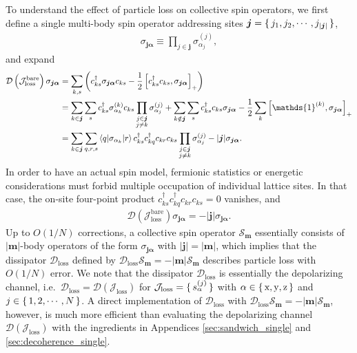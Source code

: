 \documentclass[aps,pra,twocolumn,longbibliography]{revtex4-2}
\renewcommand{\t}{\text} %
\newcommand{\f}[2]{\dfrac{#1}{#2}} %
\newcommand{\p}[1]{\left( #1 \right)} %
\renewcommand{\sp}[1]{\left[ #1 \right]} %
\renewcommand{\v}{\bm} %
\renewcommand{\abs}[1]{\lvert #1 \rvert}
\newcommand{\bk}{\braket} %
\newcommand{\D}{\mathcal{D}}
\newcommand{\J}{\mathcal{J}}
\renewcommand{\S}{\mathcal{S}}
\newcommand{\z}{\text{z}}
\newcommand{\x}{\text{x}}
\newcommand{\y}{\text{y}}
\newcommand{\1}{\mathds{1}}
\begin{document}
To understand the effect of particle loss on collective spin
operators, we first define a single multi-body spin operator
addressing sites $\v j=\set{j_1,j_2,\cdots,j_{\abs{\v j}}}$,
\begin{align}
  \sigma_{\v j\v\alpha} \equiv \prod_{j\in\v j} \sigma_{\alpha_j}^{(j)},
\end{align}
and expand
\begin{align}
  \D\p{\J_{\t{loss}}^{\t{bare}}} \sigma_{\v j\v\alpha}
  &= \sum_{k,s} \p{c_{ks}^\dag \sigma_{\v j\v\alpha} c_{ks}
    - \f12\sp{c_{ks}^\dag c_{ks}, \sigma_{\v j\v\alpha}}_+} \\
  &= \sum_{k\in\v j} \sum_s c_{ks}^\dag \sigma_{\alpha_k}^{(k)} c_{ks}
  \prod_{\substack{j\in\v j\\j\ne k}} \sigma_{\alpha_j}^{(j)}
  + \sum_{k\notin\v j} \sum_s c_{ks}^\dag c_{ks} \sigma_{\v j\v\alpha}
  - \f12 \sum_k \sp{\1^{(k)}, \sigma_{\v j\v\alpha}}_+ \\
  &= \sum_{k\in\v j} \sum_{q,r,s} \bk{q|\sigma_{\alpha_k}|r}
  c_{ks}^\dag c_{kq}^\dag c_{kr} c_{ks}
  \prod_{\substack{j\in\v j\\j\ne k}} \sigma_{\alpha_j}^{(j)}
  - \abs{\v j} \sigma_{\v j\v\alpha}.
\end{align}
In order to have an actual spin model, fermionic statistics or
energetic considerations must forbid multiple occupation of individual
lattice sites.  In that case, the on-site four-point product
$c_{ks}^\dag c_{kq}^\dag c_{kr} c_{ks}=0$ vanishes, and
\begin{align}
  \D\p{\J_{\t{loss}}^{\t{bare}}} \sigma_{\v j\v\alpha}
  = - \abs{\v j} \sigma_{\v j\v\alpha}.
\end{align}
Up to $O(1/N)$ corrections, a collective spin operator $\S_{\v m}$
essentially consists of $\abs{\v m}$-body operators of the form
$\sigma_{\v j\v\alpha}$ with $\abs{\v j}=\abs{\v m}$, which implies
that the dissipator $\D_{\t{loss}}$ defined by
$\D_{\t{loss}}\S_{\v m}=-\abs{\v m}\S_{\v m}$ describes particle loss
with $O(1/N)$ error.  We note that the dissipator $\D_{\t{loss}}$ is
essentially the depolarizing channel,
i.e.~$\D_{\t{loss}}=\D\p{\J_{\t{loss}}}$ for
$\J_{\t{loss}} = \set{s_\alpha^{(j)}}$ with $\alpha\in\set{\x,\y,\z}$
and $j\in\set{1,2,\cdots,N}$.  A direct implementation of
$\D_{\t{loss}}$ with $\D_{\t{loss}}\S_{\v m}=-\abs{\v m}\S_{\v m}$,
however, is much more efficient than evaluating the depolarizing
channel $\D\p{\J_{\t{loss}}}$ with the ingredients in Appendices
\ref{sec:sandwich_single} and \ref{sec:decoherence_single}.
\end{document}
